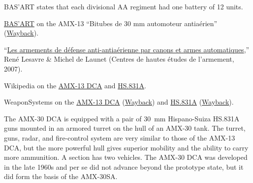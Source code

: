 \begin{withcounters}
{        BAS'ART states that each divisional AA regiment had one battery of 12 units.

        \begin{notesources}
            \item \href{https://artillerie.asso.fr/basart/article.php3?id_article=1086}{BAS'ART} on the AMX-13 “\foreignlanguage{french}{Bitubes de 30 mm automoteur antiaérien}” (\href{https://web.archive.org/web/20260624131035/https://artillerie.asso.fr/basart/article.php3?id_article=1086\%2A}{Wayback}).
            \item “\href{https://www.yumpu.com/fr/document/view/16630048/les-armements-de-defense-antiaerienne-souvenirs-de-la-}{\foreignlanguage{french}{Les armements de défense anti-antiaérienne par canons et armes automatiques}},” René Lesavre \& Michel de Launet (\foreignlanguage{french}{Centres de hautes études de l'armement}, 2007).
            \item Wikipedia on the \href{https://en.wikipedia.org/wiki/AMX-13\#Production_variants}{AMX-13 DCA} and \href{https://en.wikipedia.org/wiki/Oerlikon_KCB}{HS.831A}.
            \item WeaponSystems on the \href{https://weaponsystems.net/system/61-AMX-13\%20DCA}{AMX-13 DCA} (\href{https://web.archive.org/web/20260624131956/https://weaponsystems.net/system/61-AMX-13\%20DCA}{Wayback}) and \href{https://weaponsystems.net/system/1562-30mm\%20Hispano-Suiza\%20HS.831}{HS.831A} (\href{https://web.archive.org/web/20260624132150/https://weaponsystems.net/system/1562-30mm\%20Hispano-Suiza\%20HS.831}{Wayback}).
        \end{notesources}
    }


    The AMX-30 DCA is equipped with a pair of 30~mm Hispano-Suiza HS.831A guns mounted in an armored turret on the hull of an AMX-30 tank.
    The turret, guns, radar, and fire-control system are very similar to those of the AMX-13 DCA, but the more powerful hull gives superior mobility and the ability to carry more ammunition.
    A section has two vehicles.
    The AMX-30 DCA was developed in the late 1960s and per se did not advance beyond the prototype state, but it did form the basis of the AMX-30SA.%
\end{withcounters}

